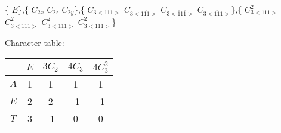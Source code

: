 \documentclass[12pt]{report}
\begin{document}
\{ $E$\},\{ $C_{2x}$ $C_{2z}$ $C_{2y}$\},\{ $C_{3{<}111{>}}$ $C_{3{<}1\overline{11}{>}}$ $C_{3{<}\overline{1}1\overline{1}{>}}$ $C_{3{<}\overline{11}1{>}}$\},\{ $C_{3{<}111{>}}^2$ $C_{3{<}1\overline{11}{>}}^2$ $C_{3{<}\overline{1}1\overline{1}{>}}^2$ $C_{3{<}\overline{11}1{>}}^2$\}

Character table:

\newline

\begin{tabular}{c | c c c c } 
& $E$& $3C_2$& $4C_3$& $4C_3^2$\\ 
 \hline 
$A$& 1& 1& 1& 1\\
$E$& 2& 2& -1& -1\\
 $T$& 3& -1& 0& 0\\
\end{tabular}
\end{document}
